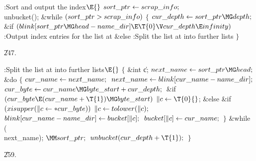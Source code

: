 \B{}:Sort and output the index\X${}\E{}$\6
$\\{sort\_ptr}\leftarrow\\{scrap\_info};{}$\6
\\{unbucket}();\6
\&{while} ${}(\\{sort\_ptr}>\\{scrap\_info}){}$\5
${}\{{}$\1\6
${}\\{cur\_depth}\K\\{sort\_ptr}\MG\\{depth};{}$\6
\&{if} ${}(\\{blink}[\\{sort\_ptr}\MG\\{head}-\\{name\_dir}]\E\T{0}\V\\{cur%
\_depth}\E\\{infinity}){}$\1\5
:Output index entries for the list at \X\2\6
\&{else}\1\5
:Split the list at  into further lists\X\2\6
\4${}\}{}$\2\par
\U247.\fi

\B{}:Split the list at  into further lists\X${}%
\E{}$\6
${}\{{}$\1\6
\&{int} \|c;\7
${}\\{next\_name}\K\\{sort\_ptr}\MG\\{head};{}$\6
\&{do}\5
${}\{{}$\1\6
${}\\{cur\_name}\leftarrow\\{next\_name};{}$\6
${}\\{next\_name}\leftarrow\\{blink}[\\{cur\_name}-\\{name\_dir}];{}$\6
${}\\{cur\_byte}\K\\{cur\_name}\MG\\{byte\_start}+\\{cur\_depth};{}$\6
\&{if} ${}(\\{cur\_byte}\E(\\{cur\_name}+\T{1})\MG\\{byte\_start}){}$\1\5
${}\|c\K\T{0}{}$;\2\6
\&{else} \&{if} ${}(\\{xisupper}(\|c\leftarrow{*}\\{cur\_byte})){}$\1\5
${}\|c\leftarrow\\{tolower}(\|c);{}$\2\6
${}\\{blink}[\\{cur\_name}-\\{name\_dir}]\leftarrow\\{bucket}[\|c];{}$\6
${}\\{bucket}[\|c]\leftarrow\\{cur\_name};{}$\6
\4${}\}{}$\2\5
\&{while} (\\{next\_name});\6
${}\MM\\{sort\_ptr};{}$\6
${}\\{unbucket}(\\{cur\_depth}+\T{1});{}$\6
\4${}\}{}$\2\par
\U259.\fi


